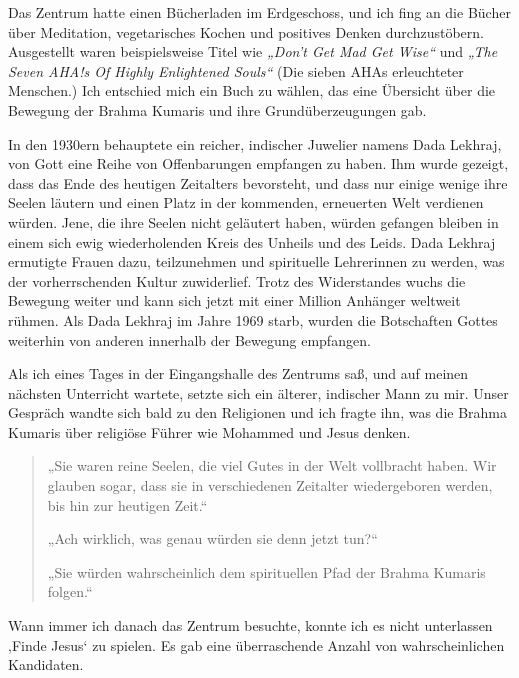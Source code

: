 \documentclass[12pt]{memoir}
\begin{document}
Das Zentrum hatte einen Bücherladen im Erdgeschoss,
und ich fing an die Bücher über Meditation, vegetarisches Kochen
und positives Denken durchzustöbern.
Ausgestellt waren beispielsweise Titel wie
\emph{„Don’t Get Mad Get Wise“} und
\emph{„The Seven AHA!s Of Highly Enlightened Souls“}
(Die sieben AHAs erleuchteter Menschen.)
Ich entschied mich ein Buch zu wählen,
das eine Übersicht über die Bewegung der Brahma Kumaris
und ihre Grundüberzeugungen gab.

In den 1930ern behauptete ein reicher, indischer Juwelier namens Dada Lekhraj,
von Gott eine Reihe von Offenbarungen empfangen zu haben.
Ihm wurde gezeigt, dass das Ende des heutigen Zeitalters bevorsteht,
und dass nur einige wenige ihre Seelen läutern
und einen Platz in der kommenden, erneuerten Welt verdienen würden.
Jene, die ihre Seelen nicht geläutert haben,
würden gefangen bleiben in einem sich ewig wiederholenden Kreis
des Unheils und des Leids.
Dada Lekhraj ermutigte Frauen dazu,
teilzunehmen und spirituelle Lehrerinnen zu werden,
was der vorherrschenden Kultur zuwiderlief.
Trotz des Widerstandes wuchs die Bewegung weiter
und kann sich jetzt mit einer Million Anhänger weltweit rühmen.
Als Dada Lekhraj im Jahre 1969 starb,
wurden die Botschaften Gottes weiterhin
von anderen innerhalb der Bewegung empfangen.

Als ich eines Tages in der Eingangshalle des Zentrums saß,
und auf meinen nächsten Unterricht wartete,
setzte sich ein älterer, indischer Mann zu mir.
Unser Gespräch wandte sich bald zu den Religionen und ich fragte ihn,
was die Brahma Kumaris über religiöse Führer wie Mohammed und Jesus denken.

\begin{quote}
„Sie waren reine Seelen, die viel Gutes in der Welt vollbracht haben.
Wir glauben sogar, dass sie in verschiedenen Zeitalter wiedergeboren werden,
bis hin zur heutigen Zeit.“

„Ach wirklich, was genau würden sie denn jetzt tun?“

„Sie würden wahrscheinlich dem spirituellen Pfad der Brahma Kumaris folgen.“
\end{quote}

Wann immer ich danach das Zentrum besuchte,
konnte ich es nicht unterlassen ‚Finde Jesus‘ zu spielen.
Es gab eine überraschende Anzahl von wahrscheinlichen Kandidaten.
\end{document}
